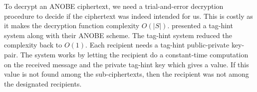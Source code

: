 \begin{frame}
  \begin{figure}
    \begin{algorithmic}[1]
        \pause{}

          \State{%
            \Return{$\bot$}
          }
        \EndIf{}

        \pause{}

            \State{\Return{$\bot$}}
          \EndIf{}
        \EndFor{}
        \State{\Return{$\bot$}}
      \EndFunction{}
    \end{algorithmic}
  \end{figure}
\end{frame}

%
%

To decrypt an \ac{ANOBE} ciphertext, we need a trial-and-error decryption 
procedure to decide if the ciphertext was indeed intended for us.
This is costly as it makes the decryption function complexity \(O(|S|)\).
\citet{ANOBE} presented a tag-hint system along with their \ac{ANOBE} scheme.
The tag-hint system reduced the complexity back to \(O(1)\).
Each recipient needs a tag-hint public-private key-pair.
The system works by letting the recipient do a constant-time computation on the 
received message and the private tag-hint key which gives a value.
If this value is not found among the sub-ciphertexts, then the recipient was 
not among the designated recipients.

